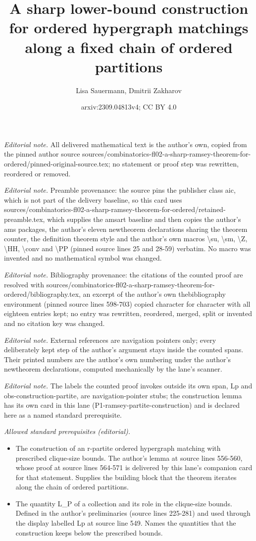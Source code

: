 \documentclass[10pt,a4paper]{amsart}
\title{A sharp lower-bound construction for ordered hypergraph matchings along a fixed chain of ordered partitions}
\author{Lisa Sauermann, Dmitrii Zakharov}
\date{arxiv:2309.04813v4; CC BY 4.0}
\theoremstyle{definition}
\begin{document}
\maketitle
\noindent\textit{Editorial note.} All delivered mathematical text is the author's own, copied from the pinned author source sources/combinatorics-fl02-a-sharp-ramsey-theorem-for-ordered/pinned-original-source.tex; no statement or proof step was rewritten, reordered or removed.\par\medskip
\noindent\textit{Editorial note.} Preamble provenance: the source pins the publisher class aic, which is not part of the delivery baseline, so this card uses sources/combinatorics-fl02-a-sharp-ramsey-theorem-for-ordered/retained-preamble.tex, which supplies the amsart baseline and then copies the author's ams packages, the author's eleven newtheorem declarations sharing the theorem counter, the definition theorem style and the author's own macros \textbackslash{}su, \textbackslash{}sm, \textbackslash{}Z, \textbackslash{}HH, \textbackslash{}conv and \textbackslash{}PP (pinned source lines 25 and 28-59) verbatim. No macro was invented and no mathematical symbol was changed.\par\medskip
\noindent\textit{Editorial note.} Bibliography provenance: the citations of the counted proof are resolved with sources/combinatorics-fl02-a-sharp-ramsey-theorem-for-ordered/bibliography.tex, an excerpt of the author's own thebibliography environment (pinned source lines 598-703) copied character for character with all eighteen entries kept; no entry was rewritten, reordered, merged, split or invented and no citation key was changed.\par\medskip
\noindent\textit{Editorial note.} External references are navigation pointers only; every deliberately kept step of the author's argument stays inside the counted spans. Their printed numbers are the author's own numbering under the author's newtheorem declarations, computed mechanically by the lane's scanner.\par\medskip
\noindent\textit{Editorial note.} The labels the counted proof invokes outside its own span, Lp and obs-construction-partite, are navigation-pointer stubs; the construction lemma has its own card in this lane (P1-ramsey-partite-construction) and is declared here as a named standard prerequisite.\par\medskip
\noindent\textit{Allowed standard prerequisites (editorial).}\begin{itemize}
\item The construction of an r-partite ordered hypergraph matching with prescribed clique-size bounds. The author's lemma at source lines 556-560, whose proof at source lines 564-571 is delivered by this lane's companion card for that statement. Supplies the building block that the theorem iterates along the chain of ordered partitions.
\item The quantity L\_P of a collection and its role in the clique-size bounds. Defined in the author's preliminaries (source lines 225-281) and used through the display labelled Lp at source line 549. Names the quantities that the construction keeps below the prescribed bounds.
\end{itemize}\medskip
\end{document}
